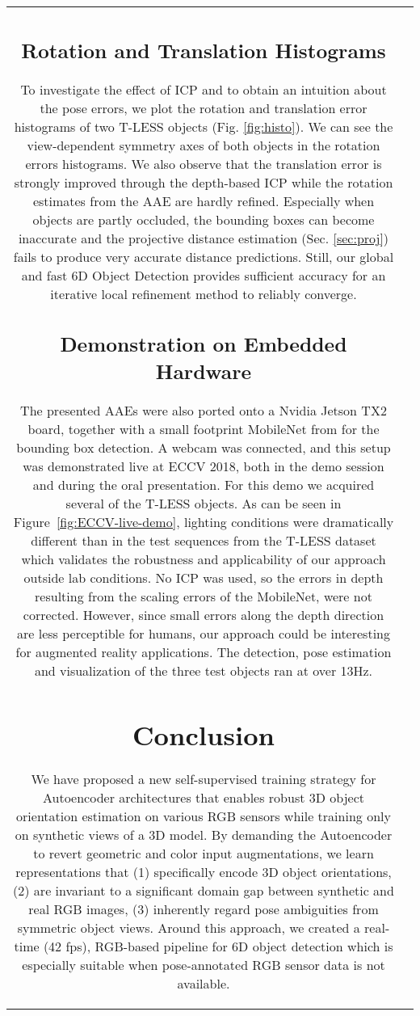 \begin{table}[t]
\begin{tabular}{cc}
	\subsection{Rotation and Translation Histograms}
	
	To investigate the effect of \gls{ICP} and to obtain an intuition about the pose errors, we plot the rotation and translation error histograms of two T-LESS objects (Fig. \ref{fig:histo}). We can see the view-dependent symmetry axes of both objects in the rotation errors histograms. We also observe that the translation error is strongly improved through the depth-based ICP while the rotation estimates from the \gls{AAE} are hardly refined. Especially when objects are partly occluded, the bounding boxes can become inaccurate and the projective distance estimation (Sec. \ref{sec:proj}) fails to produce very accurate distance predictions. Still, our global and fast 6D Object Detection provides sufficient accuracy for an iterative local refinement method to reliably converge.
	
	\subsection{Demonstration on Embedded Hardware}
	
	The presented \glspl{AAE} were also ported onto a Nvidia Jetson TX2 board, together with a small footprint MobileNet from \cite{howard2017mobilenets} for the bounding box detection. A webcam was connected, and this setup was demonstrated live at ECCV 2018, both in the demo session and during the oral presentation. For this demo we acquired several of the T-LESS objects. As can be seen in Figure~\ref{fig:ECCV-live-demo}, lighting conditions were dramatically different than in the test sequences from the T-LESS dataset which validates the robustness and applicability of our approach outside lab conditions. No ICP was used, so the errors in depth resulting from the scaling errors of the MobileNet, were not corrected. However, since small errors along the depth direction are less perceptible for humans, our approach could be interesting for augmented reality applications. The detection, pose estimation and visualization of the three test objects ran at over 13Hz.
	
	\section{Conclusion}
	We have proposed a new self-supervised training strategy for Autoencoder architectures that enables robust 3D object orientation estimation on various RGB sensors while training only on synthetic views of a 3D model. By demanding the Autoencoder to revert geometric and color input augmentations, we learn representations that (1) specifically encode 3D object orientations, (2) are invariant to a significant domain gap between synthetic and real RGB images, (3) inherently regard pose ambiguities from symmetric object views. Around this approach, we created a real-time (42 fps), RGB-based pipeline for 6D object detection which is especially suitable when pose-annotated RGB sensor data is not available.
	

\end{tabular}
\end{table}
